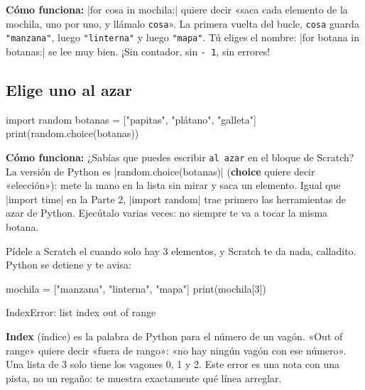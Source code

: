 \textbf{Cómo funciona:} \py|for cosa in mochila:| quiere decir «saca cada elemento de la mochila, uno por uno, y llámalo \texttt{cosa}». La primera vuelta del bucle, \texttt{cosa} guarda \texttt{"manzana"}, luego \texttt{"linterna"} y luego \texttt{"mapa"}. Tú eliges el nombre: \py|for botana in botanas:| se lee muy bien. ¡Sin contador, sin \texttt{- 1}, sin errores!

\subsection*{Elige uno al azar}

\begin{center}
\begin{scratch}
\end{scratch}
\end{center}
\begin{code}
import random
botanas = ["papitas", "plátano", "galleta"]
print(random.choice(botanas))
\end{code}

\textbf{Cómo funciona:} ¿Sabías que puedes escribir \texttt{al azar} en el bloque  de Scratch? La versión de Python es \py|random.choice(botanas)| (\textbf{choice} quiere decir «elección»): mete la mano en la lista sin mirar y saca un elemento. Igual que \py|import time| en la Parte 2, \py|import random| trae primero las herramientas de azar de Python. Ejecútalo varias veces: no siempre te va a tocar la misma botana.

\begin{watchout}
Pídele a Scratch el  cuando solo hay 3 elementos, y Scratch te da nada, calladito. Python se detiene y te avisa:
\begin{codenonum}
mochila = ["manzana", "linterna", "mapa"]
print(mochila[3])
\end{codenonum}
\begin{errorbox}
IndexError: list index out of range
\end{errorbox}
\textbf{Index} (índice) es la palabra de Python para el número de un vagón. «Out of range» quiere decir «fuera de rango»: «no hay ningún vagón con ese número». Una lista de 3 solo tiene los vagones 0, 1 y 2. Este error es una nota con una pista, no un regaño: te muestra exactamente qué línea arreglar.
\end{watchout}

